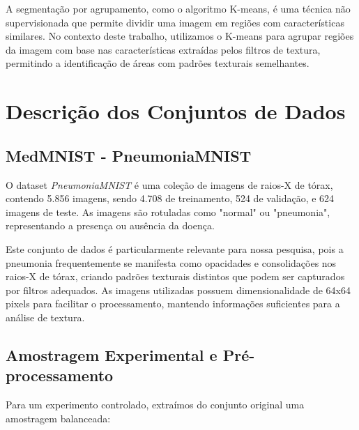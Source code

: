 \documentclass[sigconf,nonacm]{acmart}
\begin{document}
A segmentação por agrupamento, como o algoritmo K-means, é uma técnica não supervisionada que permite dividir uma imagem em regiões com características similares. No contexto deste trabalho, utilizamos o K-means para agrupar regiões da imagem com base nas características extraídas pelos filtros de textura, permitindo a identificação de áreas com padrões texturais semelhantes.

\section{Descrição dos Conjuntos de Dados}
\subsection{MedMNIST - PneumoniaMNIST}

O dataset \textit{PneumoniaMNIST} \cite{medmnistv1_2021} é uma coleção de imagens de raios-X de tórax, contendo 5.856 imagens, sendo 4.708 de treinamento, 524 de validação, e 624 imagens de teste. As imagens são rotuladas como "normal" ou "pneumonia", representando a presença ou ausência da doença.

Este conjunto de dados é particularmente relevante para nossa pesquisa, pois a pneumonia frequentemente se manifesta como opacidades e consolidações nos raios-X de tórax, criando padrões texturais distintos que podem ser capturados por filtros adequados. As imagens utilizadas possuem dimensionalidade de 64x64 pixels para facilitar o processamento, mantendo informações suficientes para a análise de textura.

\subsection{Amostragem Experimental e Pré-processamento}
Para um experimento controlado, extraímos do conjunto original uma amostragem balanceada:

\begin{table}[h]
  \centering
  \caption{Amostragem utilizada nos experimentos}
  \label{tab:experimental_splits}
\end{table}
\end{document}
